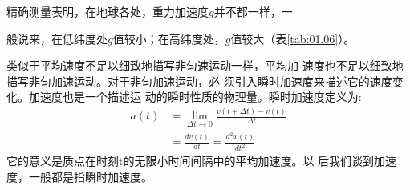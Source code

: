 精确测量表明，在地球各处，重力加速度$g$并不都一样，一
\begin{table}[!b]
    \vspace{-0.5em}
    \caption{地球上不同地点的$g$值}
    \label{tab:01.06}
    \centering
    \vspace{-1.2em}
\end{table}
\clearpage
\noindent 般说来，在低纬度处$g$值较小；在高纬度处，$g$值较大（表\ref{tab:01.06}）。

类似于平均速度不足以细致地描写非匀速运动一样，平均加
速度也不足以细致地描写非匀加速运动。对于非匀加速运动，必
须引入瞬时加速度来描述它的速度变化。加速度也是一个描述运
动的瞬时性质的物理量。瞬时加速度定义为:
\begin{equation*}
    \begin{aligned}
        a(t) &=\lim _{\Delta t \rightarrow 0} \frac{v(t+\Delta t)-v(t)}{\Delta t} \\
        &=\frac{dv(t)}{dt}=\frac{d^2 x(t)}{d t^2}
    \end{aligned}
\end{equation*}
它的意义是质点在时刻t的无限小时间间隔中的平均加速度。以
后我们谈到加速度，一般都是指瞬时加速度。

